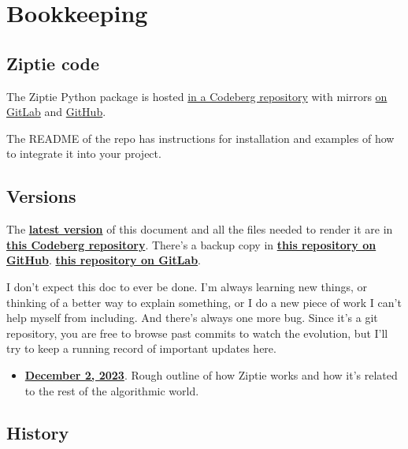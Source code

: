 \section{Bookkeeping}
\label{sec:bookkeeping}

\subsection{Ziptie code}
\label{subsec:code}

The Ziptie Python package is hosted
\href{
https://codeberg.org/brohrer/ziptie
}{in a Codeberg repository}
with mirrors
\href{
https://gitlab.com/brohrer/ziptie
}{on GitLab} and
\href{
https://github.com/brohrer/ziptie
}{GitHub}.

The README of the repo has instructions for installation and
examples of how to integrate it into your project.

\subsection{Versions}
\label{subsec:versions}

The \textbf{\href{
https://codeberg.org/brohrer/ziptie-paper/src/branch/main/ziptie.pdf}
{latest version}}
of this document and all the files needed to
render it are in \textbf{\href{
https://codeberg.org/brohrer/ziptie-paper}
{this Codeberg repository}}. There's a backup copy in \textbf{
\href{https://github.com/brohrer/ziptie-paper}
{this repository on GitHub}}.
 \textbf{
\href{https://gitlab.com/brohrer/ziptie-paper}
{this repository on GitLab}}.

I don't expect this doc to ever be done. I'm always learning new things,
or thinking of a better way to explain something, or I do a new
piece of work I can't help myself from including. And there's always
one more bug.
Since it's a git repository, you are free to browse past commits to watch
the evolution, but I'll try to keep a running record of important updates
here.

\begin{itemize}
\item{\textbf{\href{
https://codeberg.org/brohrer/ziptie-paper/src/commit/758b34e0749b75f35c98818d11d41553a8828b48/ziptie.pdf}
{December 2, 2023}}. Rough outline of how Ziptie works
and how it's related to the rest of the algorithmic world.}
\end{itemize}

\subsection{History}
\label{subsec:history}

